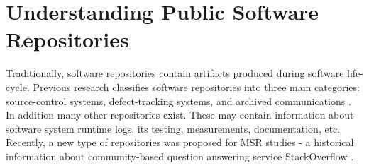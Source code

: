 \section{Understanding Public Software Repositories}
Traditionally, software repositories contain artifacts produced during software life-cycle. 
Previous research classifies software repositories into three main categories: source-control systems, defect-tracking systems,
and archived communications \cite{citeulike:4534888}. 
In addition many other repositories exist. These may contain information about software system runtime logs, its testing, 
measurements, documentation, etc.
Recently, a new type of repositories was proposed for MSR studies - a historical information about community-based question 
answering service StackOverflow \cite{MSRChallenge2013}.

